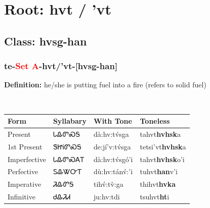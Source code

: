 \needspace{4in}
\section*{Root: hvt / 'vt}
\nopagebreak
{}
\needspace{3in}
\subsection*{Class: hvsg-han}
\nopagebreak
\needspace{2in}
\subsubsection*{te{-}\textcolor{Red}{Set A}{-}\textbf{hvt/'vt}{-}[hvsg-han]}
\nopagebreak
\textbf{Definition: } he/she is putting fuel into a fire (refers to solid fuel)
\\[0.5em]
\begin{tabularx}{\textwidth}{l X X X}%
\toprule%
\textbf{Form}&\textbf{Syllabary}&\textbf{With Tone}&\textbf{Toneless}\\%
\midrule%
Present&ᏓᎲᏛᏍᎦ&dà:hv:tv́sga&tahvt\textbf{hvhsk}a\\%
1st Present&ᏕᏥᎥᏛᏍᎦ&de:jí’v:tv́sga&tetsi'vt\textbf{hvhsk}a\\%
Imperfective&ᏓᎲᏛᏍᎪᎢ&dà:hv:tv́sgó’i&tahvt\textbf{hvhsk}o'i\\%
Perfective&ᏚᎲᏔᏅᎢ&dù:hv:tánv́:’i&tuhvt\textbf{han}v'i\\%
Imperative&ᏘᎲᏛᎦ&tihv́:tv̀:ga&thihvt\textbf{hvka}\\%
Infinitive&ᏧᎲᏘᏗ&ju:hv:tdi&tsuhvt\textbf{ht}i\\%
\bottomrule%
\end{tabularx}
\\[1em]